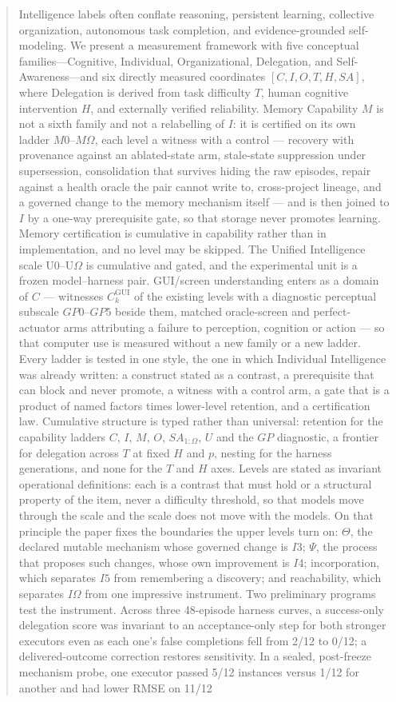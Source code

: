 \documentclass[11pt]{article}
\theoremstyle{definition}
\newcommand{\Om}{\ensuremath{\Omega}}
\begin{document}
\begin{abstract}
Intelligence labels often conflate reasoning, persistent learning, collective organization, autonomous task completion, and evidence-grounded self-modeling. We present a measurement framework with five conceptual families---Cognitive, Individual, Organizational, Delegation, and Self-Awareness---and six directly measured coordinates $[C,I,O,T,H,SA]$, where Delegation is derived from task difficulty $T$, human cognitive intervention $H$, and externally verified reliability. Memory Capability $M$ is not a sixth family and not a relabelling of $I$: it is certified on its own ladder $M0$--$M\Om{}$, each level a witness with a control --- recovery with provenance against an ablated-state arm, stale-state suppression under supersession, consolidation that survives hiding the raw episodes, repair against a health oracle the pair cannot write to, cross-project lineage, and a governed change to the memory mechanism itself --- and is then joined to $I$ by a one-way prerequisite gate, so that storage never promotes learning. Memory certification is cumulative in capability rather than in implementation, and no level may be skipped. The Unified Intelligence scale U0--U\Om{} is cumulative and gated, and the experimental unit is a frozen model--harness pair. GUI/screen understanding enters as a domain of $C$ --- witnesses $C^{\mathrm{GUI}}_k$ of the existing levels with a diagnostic perceptual subscale $GP0$--$GP5$ beside them, matched oracle-screen and perfect-actuator arms attributing a failure to perception, cognition or action --- so that computer use is measured without a new family or a new ladder. Every ladder is tested in one style, the one in which Individual Intelligence was already written: a construct stated as a contrast, a prerequisite that can block and never promote, a witness with a control arm, a gate that is a product of named factors times lower-level retention, and a certification law. Cumulative structure is typed rather than universal: retention for the capability ladders $C$, $I$, $M$, $O$, $SA_{1:\Omega}$, $U$ and the $GP$ diagnostic, a frontier for delegation across $T$ at fixed $H$ and $p$, nesting for the harness generations, and none for the $T$ and $H$ axes. Levels are stated as invariant operational definitions: each is a contrast that must hold or a structural property of the item, never a difficulty threshold, so that models move through the scale and the scale does not move with the models. On that principle the paper fixes the boundaries the upper levels turn on: $\Theta$, the declared mutable mechanism whose governed change is $I3$; $\Psi$, the process that proposes such changes, whose own improvement is $I4$; incorporation, which separates $I5$ from remembering a discovery; and reachability, which separates $I\Om{}$ from one impressive instrument. Two preliminary programs test the instrument. Across three 48-episode harness curves, a success-only delegation score was invariant to an acceptance-only step for both stronger executors even as each one's false completions fell from 2/12 to 0/12; a delivered-outcome correction restores sensitivity. In a sealed, post-freeze mechanism probe, one executor passed 5/12 instances versus 1/12 for another and had lower RMSE on 11/12 
\end{abstract}
\end{document}
